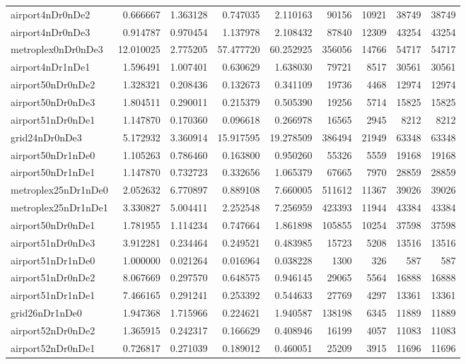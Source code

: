\begin{longtable}{|l|r|r|r|r|r|r|r|r|}
airport4nDr0nDe2 & 0.666667 & 1.363128 & 0.747035 & 2.110163 & 90156 & 10921 & 38749 & 38749 \\
airport4nDr0nDe3 & 0.914787 & 0.970454 & 1.137978 & 2.108432 & 87840 & 12309 & 43254 & 43254 \\
metroplex0nDr0nDe3 & 12.010025 & 2.775205 & 57.477720 & 60.252925 & 356056 & 14766 & 54717 & 54717 \\
airport4nDr1nDe1 & 1.596491 & 1.007401 & 0.630629 & 1.638030 & 79721 & 8517 & 30561 & 30561 \\
airport50nDr0nDe2 & 1.328321 & 0.208436 & 0.132673 & 0.341109 & 19736 & 4468 & 12974 & 12974 \\
airport50nDr0nDe3 & 1.804511 & 0.290011 & 0.215379 & 0.505390 & 19256 & 5714 & 15825 & 15825 \\
airport51nDr0nDe1 & 1.147870 & 0.170360 & 0.096618 & 0.266978 & 16565 & 2945 & 8212 & 8212 \\
grid24nDr0nDe3 & 5.172932 & 3.360914 & 15.917595 & 19.278509 & 386494 & 21949 & 63348 & 63348 \\
airport50nDr1nDe0 & 1.105263 & 0.786460 & 0.163800 & 0.950260 & 55326 & 5559 & 19168 & 19168 \\
airport50nDr1nDe1 & 1.147870 & 0.732723 & 0.332656 & 1.065379 & 67665 & 7970 & 28859 & 28859 \\
metroplex25nDr1nDe0 & 2.052632 & 6.770897 & 0.889108 & 7.660005 & 511612 & 11367 & 39026 & 39026 \\
metroplex25nDr1nDe1 & 3.330827 & 5.004411 & 2.252548 & 7.256959 & 423393 & 11944 & 43384 & 43384 \\
airport50nDr0nDe1 & 1.781955 & 1.114234 & 0.747664 & 1.861898 & 105855 & 10254 & 37598 & 37598 \\
airport51nDr0nDe3 & 3.912281 & 0.234464 & 0.249521 & 0.483985 & 15723 & 5208 & 13516 & 13516 \\
airport51nDr1nDe0 & 1.000000 & 0.021264 & 0.016964 & 0.038228 & 1300 & 326 & 587 & 587 \\
airport51nDr0nDe2 & 8.067669 & 0.297570 & 0.648575 & 0.946145 & 29065 & 5564 & 16888 & 16888 \\
airport51nDr1nDe1 & 7.466165 & 0.291241 & 0.253392 & 0.544633 & 27769 & 4297 & 13361 & 13361 \\
grid26nDr1nDe0 & 1.947368 & 1.715966 & 0.224621 & 1.940587 & 138198 & 6345 & 11889 & 11889 \\
airport52nDr0nDe2 & 1.365915 & 0.242317 & 0.166629 & 0.408946 & 16199 & 4057 & 11083 & 11083 \\
airport52nDr0nDe1 & 0.726817 & 0.271039 & 0.189012 & 0.460051 & 25209 & 3915 & 11696 & 11696 \\

\end{longtable}

